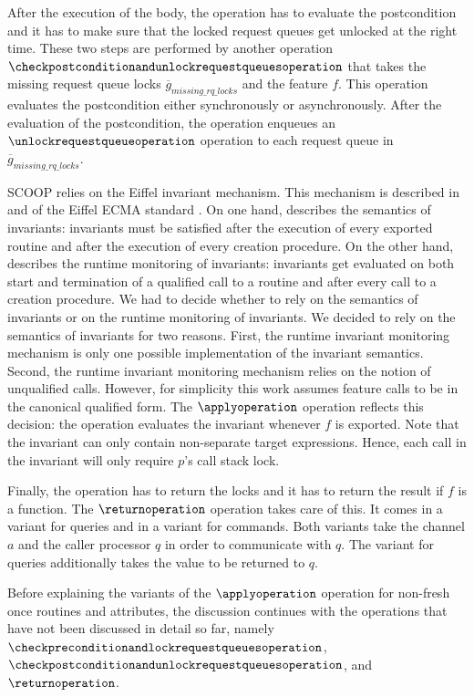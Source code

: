After the execution of the body, the operation has to evaluate the postcondition and it has to make sure that the locked request queues get unlocked at the right time. These two steps are performed by another operation $\checkpostconditionandunlockrequestqueuesoperation$ that takes the missing request queue locks $\overline{g}_{missing\_rq\_locks}$ and the feature $f$. This operation evaluates the postcondition either synchronously or asynchronously. After the evaluation of the postcondition, the operation enqueues an $\unlockrequestqueueoperation$ operation to each request queue in $\overline{g}_{missing\_rq\_locks}$.

SCOOP relies on the Eiffel invariant mechanism. This mechanism is described in  and  of the Eiffel ECMA standard \cite{ecma:2006:Eiffel}. On one hand,  describes the semantics of invariants: invariants must be satisfied after the execution of every exported routine and after the execution of every creation procedure. On the other hand,  describes the runtime monitoring of invariants: invariants get evaluated on both start and termination of a qualified call to a routine and after every call to a creation procedure. We had to decide whether to rely on the semantics of invariants or on the runtime monitoring of invariants. We decided to rely on the semantics of invariants for two reasons. First, the runtime invariant monitoring mechanism is only one possible implementation of the invariant semantics. Second, the runtime invariant monitoring mechanism relies on the notion of unqualified calls. However, for simplicity this work assumes feature calls to be in the canonical qualified form. The $\applyoperation$ operation reflects this decision: the operation evaluates the invariant whenever $f$ is exported. Note that the invariant can only contain non-separate target expressions. Hence, each call in the invariant will only require $p$'s call stack lock.

Finally, the operation has to return the locks and it has to return the result if $f$ is a function. The $\returnoperation$ operation takes care of this. It comes in a variant for queries and in a variant for commands. Both variants take the channel $a$ and the caller processor $q$ in order to communicate with $q$. The variant for queries additionally takes the value to be returned to $q$.

Before explaining the variants of the $\applyoperation$ operation for non-fresh once routines and attributes, the discussion continues with the operations that have not been discussed in detail so far, namely $\checkpreconditionandlockrequestqueuesoperation$, $\checkpostconditionandunlockrequestqueuesoperation$, and $\returnoperation$.

